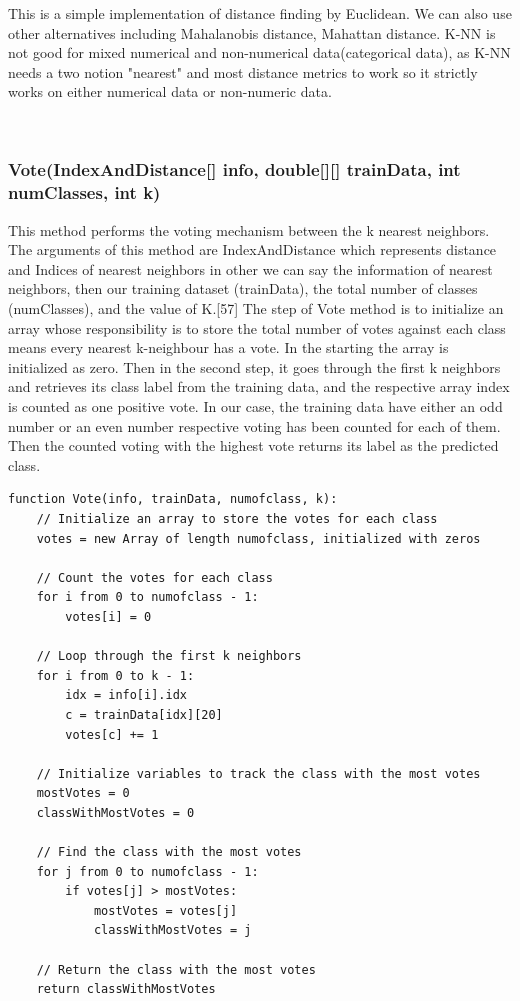 \documentclass[conference]{IEEEtran}
\begin{document}
This is a simple implementation of distance finding by Euclidean. We can also use other alternatives including Mahalanobis distance, Mahattan distance. K-NN is not good for mixed numerical and non-numerical data(categorical data), as K-NN needs a two notion "nearest" and most distance metrics to work so it strictly works on either numerical data or non-numeric data.  


\


\subsubsection{Vote(IndexAndDistance[] info, double[][] trainData, int numClasses, int k)}
This method performs the voting mechanism between the k nearest neighbors. The arguments of this method are IndexAndDistance which represents distance and Indices of nearest neighbors in other we can say the information of nearest neighbors, then our training dataset (trainData), the total number of classes (numClasses), and the value of K.[57] The step of Vote method is to initialize an array whose responsibility is to store the total number of votes against each class means every nearest k-neighbour has a vote. In the starting the array is initialized as zero. Then in the second step, it goes through the first k neighbors and retrieves its class label from the training data, and the respective array index is counted as one positive vote. In our case, the training data have either an odd number or an even number respective voting has been counted for each of them. Then the counted voting with the highest vote returns its label as the predicted class. 

\begin{lstlisting}
function Vote(info, trainData, numofclass, k):
    // Initialize an array to store the votes for each class
    votes = new Array of length numofclass, initialized with zeros
    
    // Count the votes for each class
    for i from 0 to numofclass - 1:
        votes[i] = 0
    
    // Loop through the first k neighbors
    for i from 0 to k - 1:
        idx = info[i].idx
        c = trainData[idx][20]
        votes[c] += 1
    
    // Initialize variables to track the class with the most votes
    mostVotes = 0
    classWithMostVotes = 0
    
    // Find the class with the most votes
    for j from 0 to numofclass - 1:
        if votes[j] > mostVotes:
            mostVotes = votes[j]
            classWithMostVotes = j
    
    // Return the class with the most votes
    return classWithMostVotes


\end{lstlisting}
\end{document}
